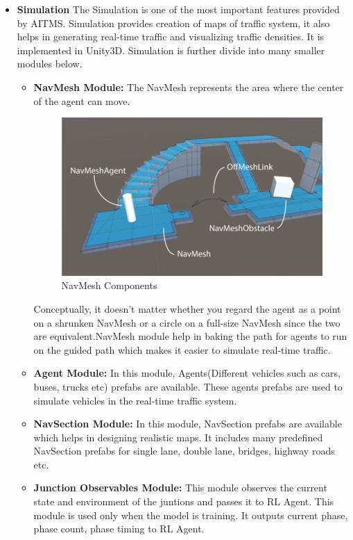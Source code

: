 \documentclass[openany,12pt]{report}
\begin{document}
		\begin{itemize}
			
			\item{\textbf{Simulation} The Simulation is one of the most important features provided by AITMS. Simulation provides creation of maps of traffic system, it also helps in generating real-time traffic and visualizing traffic densities. It is implemented in Unity3D. Simulation is further divide into many smaller modules below. \begin{itemize}
			\item{\textbf{NavMesh Module:} The NavMesh represents the area where the center of the agent can move. 
			\begin{figure}[H]
				\centering
				\includegraphics[width=3 in]{./Diagrams/PNG/NavMeshModule}
				\caption{NavMesh Components}
			\end{figure}
			Conceptually, it doesn’t matter whether you regard the agent as a point on a shrunken NavMesh or a circle on a full-size NavMesh since the two are equivalent.NavMesh module help in baking the path for agents to run on the guided path which makes it easier to simulate real-time traffic.}
			
			\item{\textbf{Agent Module:} In this module, Agents(Different vehicles such as cars, buses, trucks etc) prefabs are available. These agents prefabs are used to simulate vehicles in the real-time traffic system.}
			\item{\textbf{NavSection Module:} In this module, NavSection prefabs are available which helps in designing realistic maps. It includes many predefined NavSection prefabs for single lane, double lane, bridges, highway roads etc. }
			\item{\textbf{Junction Observables Module:} This module observes the current state and environment of the juntions and passes it to RL Agent. This module is used only when the model is training. It outputs current phase, phase count, phase timing  to RL Agent.}
			\end{itemize}			 
			}
			

\end{itemize}
\end{document}
